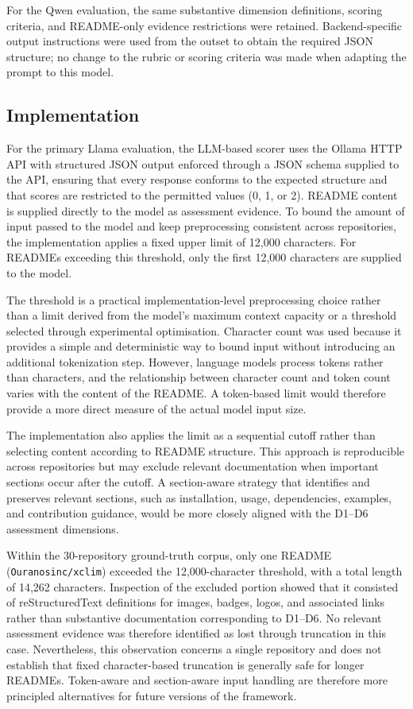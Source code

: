 For the Qwen evaluation, the same substantive dimension definitions, 
scoring criteria, and README-only evidence restrictions were retained. 
Backend-specific output instructions were used from the outset to obtain 
the required JSON structure; no change to the rubric or scoring criteria 
was made when adapting the prompt to this model.

\subsection{Implementation}

For the primary Llama evaluation, the LLM-based scorer uses the
Ollama HTTP API with structured JSON output enforced through a JSON
schema supplied to the API, ensuring that every response conforms to
the expected structure and that scores are restricted to the
permitted values (0, 1, or 2).
README content is supplied directly to the model as assessment
evidence. To bound the amount of input passed to the model and keep
preprocessing consistent across repositories, the implementation
applies a fixed upper limit of 12,000 characters. For READMEs
exceeding this threshold, only the first 12,000 characters are
supplied to the model.

The threshold is a practical implementation-level preprocessing
choice rather than a limit derived from the model's maximum context
capacity or a threshold selected through experimental optimisation.
Character count was used because it provides a simple and
deterministic way to bound input without introducing an additional
tokenization step. However, language models process tokens rather
than characters, and the relationship between character count and
token count varies with the content of the README. A token-based
limit would therefore provide a more direct measure of the actual
model input size.

The implementation also applies the limit as a sequential cutoff
rather than selecting content according to README structure. This
approach is reproducible across repositories but may exclude relevant
documentation when important sections occur after the cutoff. A
section-aware strategy that identifies and preserves relevant
sections, such as installation, usage, dependencies, examples, and
contribution guidance, would be more closely aligned with the D1--D6
assessment dimensions.

Within the 30-repository ground-truth corpus, only one README
(\texttt{Ouranosinc/xclim}) exceeded the 12,000-character threshold,
with a total length of 14,262 characters. Inspection of the excluded
portion showed that it consisted of reStructuredText definitions for
images, badges, logos, and associated links rather than substantive
documentation corresponding to D1--D6. No relevant assessment
evidence was therefore identified as lost through truncation in this
case. Nevertheless, this observation concerns a single repository
and does not establish that fixed character-based truncation is
generally safe for longer READMEs. Token-aware and section-aware
input handling are therefore more principled alternatives for future
versions of the framework.

